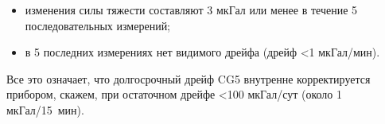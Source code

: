 \begin{itemize}
\begin{itemize}
        \item изменения силы тяжести составляют 3 мкГал или менее в течение 5
        последовательных измерений;
        
        \item в 5 последних измерениях нет видимого дрейфа (дрейф <1 мкГал/мин).

    \end{itemize}
    
    Все это означает, что долгосрочный дрейф CG5 внутренне корректируется
    прибором, скажем, при остаточном дрейфе <100 мкГал/сут (около 1 мкГал/15~мин).
    
\end{itemize}
